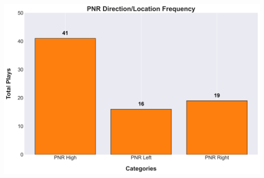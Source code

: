 \documentclass[a4paper,12pt]{article}
\begin{document}
\begin{table}[H]
{\begin{minipage}[t]{0.6\textwidth}
{\begin{tabular}
            
                
            
                
            
                
            
                
            
                
            
            \bottomrule
        \end{tabular}
        } %
    \end{minipage}
    } %
    \hfill
    \begin{minipage}[c]{0.35\textwidth} %
        \flushright
        \includegraphics[width=\textwidth, height=.14\textheight]{images/PNR_DirectionLocation_Freq.png} %
    \end{minipage}
    
\end{table}

\vspace{-1em} %
\vspace{-1em} %
\end{document}
